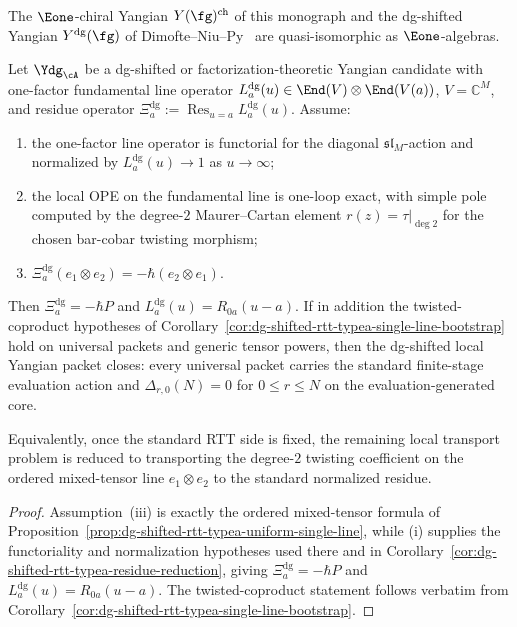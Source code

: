 \begin{conjecture}\label{conj:chiral-dg-shifted-qi}
The $\Eone$-chiral Yangian $Y(\fg)^{\mathrm{ch}}$ of this monograph and the
dg-shifted Yangian $Y^{\mathrm{dg}}(\fg)$ of Dimofte--Niu--Py~\cite{DNP25}
are quasi-isomorphic as $\Eone$-algebras.
\end{conjecture}

\begin{proposition}
\label{prop:dg-shifted-rtt-degree2-mixed-tensor-criterion}
Let $\Ydg_{\cA}$ be a dg-shifted or factorization-theoretic Yangian
candidate with one-factor fundamental line operator
$L_a^{\mathrm{dg}}(u)\in \End(V)\otimes \End(V(a))$, $V=\mathbb{C}^M$,
and residue operator
$\Xi_a^{\mathrm{dg}}:=\operatorname*{Res}_{u=a}L_a^{\mathrm{dg}}(u)$.
Assume:
\begin{enumerate}[label=\textup{(\roman*)}]
\item the one-factor line operator is functorial for the diagonal
 $\mathfrak{sl}_M$-action and normalized by
 $L_a^{\mathrm{dg}}(u)\to 1$ as $u\to\infty$;
\item the local OPE on the fundamental line is one-loop exact, with
 simple pole computed by the degree-$2$ Maurer--Cartan element
 $r(z)=\tau|_{\deg 2}$ for the chosen bar-cobar twisting morphism;
\item $\Xi_a^{\mathrm{dg}}(e_1\otimes e_2)=-\hbar(e_2\otimes e_1)$.
\end{enumerate}
Then $\Xi_a^{\mathrm{dg}}=-\hbar P$ and
$L_a^{\mathrm{dg}}(u)=R_{0a}(u-a)$.
If in addition the twisted-coproduct hypotheses of
Corollary~\ref{cor:dg-shifted-rtt-typea-single-line-bootstrap} hold on
universal packets and generic tensor powers, then the dg-shifted local
Yangian packet closes: every universal packet carries the standard
finite-stage evaluation action and $\Delta_{r,0}(N)=0$ for $0\le r\le N$
on the evaluation-generated core.

Equivalently, once the standard RTT side is fixed, the remaining local
transport problem is reduced to transporting the degree-$2$ twisting
coefficient on the ordered mixed-tensor line $e_1\otimes e_2$ to the
standard normalized residue.
\end{proposition}

\begin{proof}
Assumption~\textup{(iii)} is exactly the ordered mixed-tensor formula of
Proposition~\ref{prop:dg-shifted-rtt-typea-uniform-single-line}, while
\textup{(i)} supplies the functoriality and normalization hypotheses
used there and in
Corollary~\ref{cor:dg-shifted-rtt-typea-residue-reduction}, giving
$\Xi_a^{\mathrm{dg}}=-\hbar P$ and $L_a^{\mathrm{dg}}(u)=R_{0a}(u-a)$.
The twisted-coproduct statement follows verbatim from
Corollary~\ref{cor:dg-shifted-rtt-typea-single-line-bootstrap}.
\end{proof}

